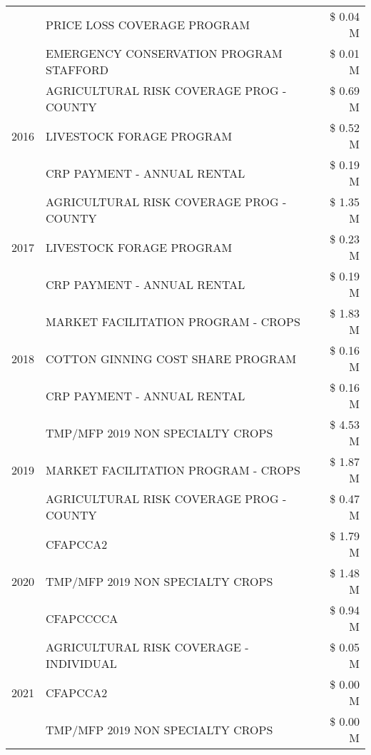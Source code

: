 \begin{tabular}{llr}
 & PRICE LOSS COVERAGE PROGRAM & \$ 0.04 M \\
 & EMERGENCY CONSERVATION PROGRAM STAFFORD & \$ 0.01 M \\
\cline{1-3}
\multirow[t]{3}{*}{2016} & AGRICULTURAL RISK COVERAGE PROG - COUNTY & \$ 0.69 M \\
 & LIVESTOCK FORAGE PROGRAM & \$ 0.52 M \\
 & CRP PAYMENT - ANNUAL RENTAL & \$ 0.19 M \\
\cline{1-3}
\multirow[t]{3}{*}{2017} & AGRICULTURAL RISK COVERAGE PROG - COUNTY & \$ 1.35 M \\
 & LIVESTOCK FORAGE PROGRAM & \$ 0.23 M \\
 & CRP PAYMENT - ANNUAL RENTAL & \$ 0.19 M \\
\cline{1-3}
\multirow[t]{3}{*}{2018} & MARKET FACILITATION PROGRAM - CROPS & \$ 1.83 M \\
 & COTTON GINNING COST SHARE PROGRAM & \$ 0.16 M \\
 & CRP PAYMENT - ANNUAL RENTAL & \$ 0.16 M \\
\cline{1-3}
\multirow[t]{3}{*}{2019} & TMP/MFP 2019 NON SPECIALTY CROPS & \$ 4.53 M \\
 & MARKET FACILITATION PROGRAM - CROPS & \$ 1.87 M \\
 & AGRICULTURAL RISK COVERAGE PROG - COUNTY & \$ 0.47 M \\
\cline{1-3}
\multirow[t]{3}{*}{2020} & CFAPCCA2 & \$ 1.79 M \\
 & TMP/MFP 2019 NON SPECIALTY CROPS & \$ 1.48 M \\
 & CFAPCCCCA & \$ 0.94 M \\
\cline{1-3}
\multirow[t]{3}{*}{2021} & AGRICULTURAL RISK COVERAGE - INDIVIDUAL & \$ 0.05 M \\
 & CFAPCCA2 & \$ 0.00 M \\
 & TMP/MFP 2019 NON SPECIALTY CROPS & \$ 0.00 M \\
\cline{1-3}
\bottomrule
\end{tabular}
